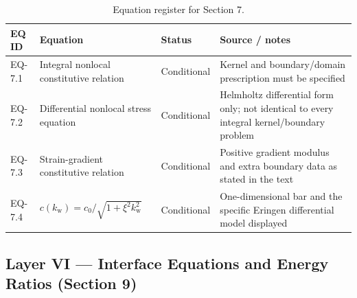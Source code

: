 \begin{table}[htbp]
\centering
\small
\caption{Equation register for Section 7.}
\label{tab:appA-sec7}
\begin{tabularx}{\textwidth}{@{}p{1.6cm}Y p{2.8cm}Y@{}}
\toprule
\textbf{EQ ID} & \textbf{Equation} & \textbf{Status} & \textbf{Source / notes} \\
\midrule
EQ-7.1 & Integral nonlocal constitutive relation & Conditional & Kernel and boundary/domain prescription must be specified \\
EQ-7.2 & Differential nonlocal stress equation & Conditional & Helmholtz differential form only; not identical to every integral kernel/boundary problem \\
EQ-7.3 & Strain-gradient constitutive relation & Conditional & Positive gradient modulus and extra boundary data as stated in the text \\
EQ-7.4 & $c(k_{\mathrm w})=c_0/\sqrt{1+\xi^2k_{\mathrm w}^2}$ & Conditional & One-dimensional bar and the specific Eringen differential model displayed \\
\bottomrule
\end{tabularx}
\end{table}

\subsection{Layer VI — Interface Equations and Energy Ratios (Section 9)}

